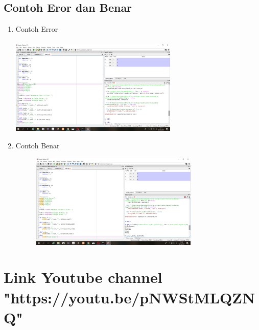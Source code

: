 \documentclass{article}
\begin{document}
\subsection{Contoh Eror dan Benar}
\begin{enumerate}
    \newpage \item Contoh Error
    \paragraph{}
        \centerline{\includegraphics[width=8cm]{image/error.png}}
    \item Contoh Benar
    \begin{figure}[h]
            \centerline{\includegraphics[width=8cm]{image/contohbenar.png}}
        \end{figure}
\end{enumerate}
\section{Link Youtube channel "https://youtu.be/pNWStMLQZNQ" }
\end{document}
